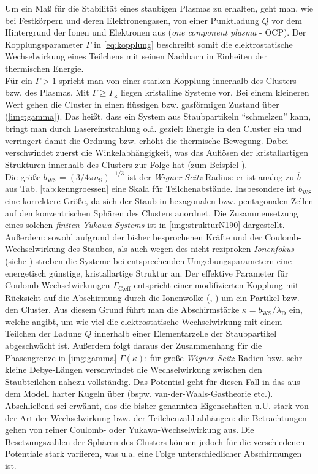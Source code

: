 \documentclass[numbers=noenddot,a4paper,notitlepage,twoside,BCOR15mm]{scrbook}
\newcommand{\ix}[1]{_\text{#1}}
\newcommand{\tilt}[1]{\textit{#1}}
\begin{document}
					 Um ein Maß für die Stabilität eines staubigen Plasmas zu erhalten, geht man, wie bei Festkörpern und deren Elektronengasen, von einer Punktladung $Q$ vor dem Hintergrund der Ionen und Elektronen aus (\tilt{one component plasma} - OCP). Der Kopplungsparameter $\Gamma$ in \autoref{eq:kopplung} beschreibt somit die elektrostatische Wechselwirkung eines Teilchens mit seinen Nachbarn in Einheiten der thermischen Energie.\\
					Für ein $\Gamma>1$ spricht man von einer starken Kopplung innerhalb des Clusters bzw. des Plasmas. Mit $\Gamma\geq\Gamma\ix{k}$ liegen kristalline Systeme vor. Bei einem kleineren Wert gehen die Cluster in einen flüssigen bzw. gasförmigen Zustand über (\autoref{img:gamma}). Das heißt, dass ein System aus Staubpartikeln "`schmelzen"' kann, bringt man durch Lasereinstrahlung o.ä. gezielt Energie in den Cluster ein und verringert damit die Ordnung bzw. erhöht die thermische Bewegung. Dabei verschwindet zuerst die Winkelabhängigkeit, was das Auflösen der kristallartigen Strukturen innerhalb des Clusters zur Folge hat (zum Beispiel \cite{Thomas96}).\\
					Die größe $b\ix{WS}=\left(3/4\pi n\ix{S}\right)^{-1/3}$ ist der \tilt{Wigner-Seitz}-Radius: er ist analog zu $\overline{b}$ aus Tab. \ref{tab:kenngroessen} eine Skala für Teilchenabstände. Insbesondere ist $b\ix{WS}$ eine korrektere Größe, da sich der Staub in hexagonalen bzw. pentagonalen Zellen auf den konzentrischen Sphären des Clusters anordnet. Die Zusammensetzung eines solchen \tilt{finiten Yukawa-Systems} ist in \autoref{img:strukturN190} dargestellt. Außerdem: sowohl aufgrund der bisher besprochenen Kräfte und der Coulomb-Wechselwirkung des Staubes, als auch wegen des nicht-reziproken \tilt{Ionenfokus} (siehe \cite{Melzer95c}) streben die Systeme bei entsprechenden Umgebungsparametern eine energetisch günstige, kristallartige Struktur an.  Der effektive Parameter für Coulomb-Wechselwirkungen $\Gamma\ix{C,eff}$ entspricht einer modifizierten Kopplung mit Rücksicht auf die Abschirmung durch die Ionenwolke (\cite{Lampe00}, \cite{Schweigert00d}) um ein Partikel bzw. den Cluster. Aus diesem Grund führt man die Abschirmstärke $\kappa=b\ix{WS}/\lambda\ix{D}$ ein, welche angibt, um wie viel die elektrostatische Wechselwirkung mit einem Teilchen der Ladung $Q$ innerhalb einer Elementarzelle der Staubpartikel abgeschwächt ist. Außerdem folgt daraus der Zusammenhang für die Phasengrenze in \autoref{img:gamma} $\Gamma\left(\kappa\right)$: für große \tilt{Wigner-Seitz}-Radien bzw. sehr kleine Debye-Längen verschwindet die Wechselwirkung zwischen den Staubteilchen nahezu vollständig. Das Potential geht für diesen Fall in das aus dem Modell harter Kugeln über (bspw. van-der-Waals-Gastheorie etc.).\\
					Abschließend sei erwähnt, das die bisher genannten Eigenschaften u.U. stark von der Art der Wechselwirkung bzw. der Teilchenzahl abhängen: die Betrachtungen gehen von reiner Coulomb- oder Yukawa-Wechselwirkung aus. Die Besetzungszahlen der Sphären des Clusters können jedoch für die verschiedenen Potentiale stark variieren, was u.a. eine Folge unterschiedlicher Abschirmungen ist.
\end{document}
